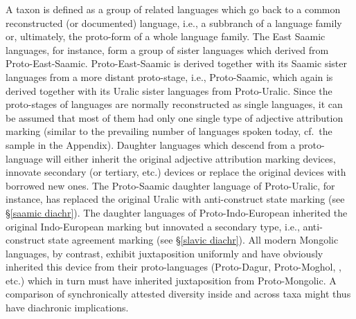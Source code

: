 A taxon is defined as a group of related languages which go back to a common reconstructed (or documented) language, i.e., a subbranch of a language family or, ultimately, the proto-form of a whole language family. The East Saamic languages, for instance, form a group of sister languages which derived from Proto\hyp{}East-Saamic. Proto\hyp{}East-Saamic is derived together with its Saamic sister languages from a more distant proto-stage, i.e., Proto\hyp{}Saamic, which again is derived together with its Uralic sister languages from Proto\hyp{}Uralic. Since the proto-stages of languages are normally reconstructed as single languages, it can be assumed that most of them had only one single type of adjective attribution marking (similar to the prevailing number of languages spoken today, cf.~the sample in the Appendix). Daughter languages which descend from a proto-language will either inherit the original adjective attribution marking devices, innovate secondary (or tertiary, etc.) devices or replace the original devices with borrowed new ones. The Proto\hyp{}Saamic daughter language of Proto\hyp{}Uralic, for instance, has replaced the original Uralic  with anti\hyp{}construct state marking (see \S\ref{saamic diachr}). The  daughter languages of Proto\hyp{}Indo-European inherited the original Indo-European  marking but innovated a secondary type, i.e., anti\hyp{}construct state agreement marking (see \S\ref{slavic diachr}). All modern Mongolic languages, by contrast, exhibit juxtaposition uniformly and have obviously inherited this device from their proto-languages (Proto\hyp{}Dagur, Proto\hyp{}Moghol, , etc.) which in turn must have inherited juxtaposition from Proto\hyp{}Mongolic. A comparison of synchronically attested diversity inside and across taxa might thus have diachronic implications.

